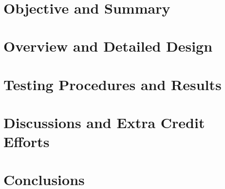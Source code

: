 \documentclass{article}
\begin{document}
\ \\
\section{Objective and Summary}

\section{Overview and Detailed Design}

\section{Testing Procedures and Results}

\section{Discussions and Extra Credit Efforts}

\section{Conclusions}
\end{document}

